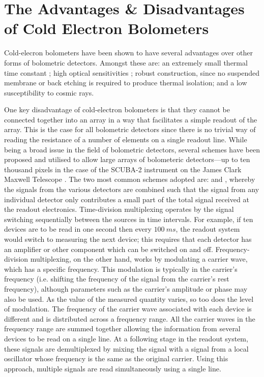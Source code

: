 \section{The Advantages \& Disadvantages of Cold Electron Bolometers} 
\label{sec:advantages} 
Cold-elecron bolometers have been shown to have several advantages over other forms of bolometric detectors. Amongst these are: an extremely small thermal time constant \parencite[][shows that there is the potential for this to be as low as $10~\mathrm{ns}$]{Kuzmin2004}; high optical sensitivities \parencite[][achieved a noise-equivalent power of $3.5 \times 10^{-17}~\mathrm{W\,Hz}^{\nicefrac{-1}{2}}$---although this was limited by the readout amplifier]{Otto2013}; robust construction, since no suspended membrane or back etching is required to produce thermal isolation; and \parencite[as shown by][]{Salatino2014} a low susceptibility to cosmic rays.
\par 
One key disadvantage of cold-electron bolometers is that they cannot be connected together into an array in a way that facilitates a simple readout of the array. This is the case for all bolometric detectors since there is no trivial way of reading the resistance of a number of elements on a single readout line. While being a broad issue in the field of bolometric detectors, several schemes have been proposed and utilised to allow large arrays of bolometeric detectors---up to ten thousand pixels in the case of the SCUBA-2 instrument on the James Clark Maxwell Telescope \textcite{Holland2013}. The two most common schemes adopted are:  and , whereby the signals from the various detectors are combined such that the signal from any individual detector only contributes a small part of the total signal received at the readout electronics. Time-division multiplexing operates by the signal switching sequentially between the sources in time intervals. For example, if ten devices are to be read in one second then every $100~ms$, the readout system would switch to measuring the next device; this requires that each detector has an amplifier or other component which can be switched on and off. Frequency-division multiplexing, on the other hand, works by modulating a carrier wave, which has a specific frequency. This modulation is typically in the carrier's frequency (i.e. shifting the frequency of the signal from the carrier's rest frequency), although parameters such as the carrier's amplitude or phase may also be used. As the value of the measured quantity varies, so too does the level of modulation. The frequency of the carrier wave associated with each device is different and is distributed across a frequency range. All the carrier waves in the frequency range are summed together allowing the information from several devices to be read on a single line. At a following stage in the readout system, these signals are demultiplexed by mixing the signal with a signal from a local oscillator whose frequency is the same as the original carrier. Using this approach, multiple signals are read simultaneously using a single line.
